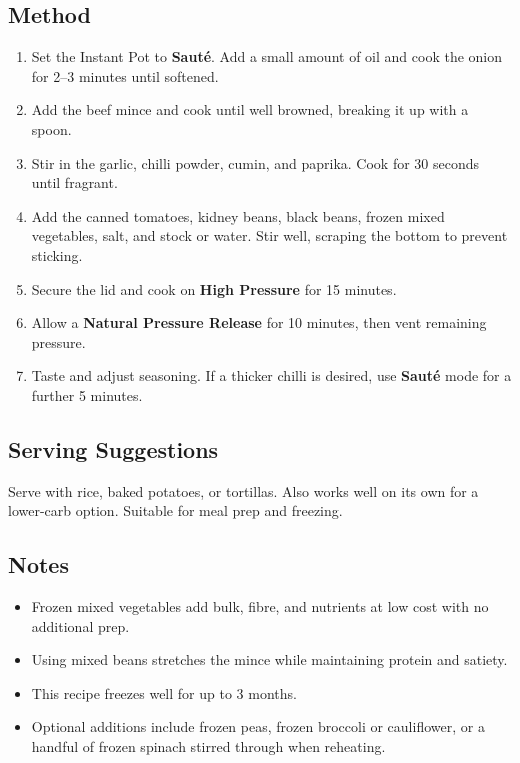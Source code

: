 \documentclass[11pt,a4paper]{article}
\begin{document}
\subsection*{Method}
\begin{enumerate}
    \item Set the Instant Pot to \textbf{Sauté}. Add a small amount of oil and cook the onion for 2--3 minutes until softened.
    \item Add the beef mince and cook until well browned, breaking it up with a spoon.
    \item Stir in the garlic, chilli powder, cumin, and paprika. Cook for 30 seconds until fragrant.
    \item Add the canned tomatoes, kidney beans, black beans, frozen mixed vegetables, salt, and stock or water. Stir well, scraping the bottom to prevent sticking.
    \item Secure the lid and cook on \textbf{High Pressure} for 15 minutes.
    \item Allow a \textbf{Natural Pressure Release} for 10 minutes, then vent remaining pressure.
    \item Taste and adjust seasoning. If a thicker chilli is desired, use \textbf{Sauté} mode for a further 5 minutes.
\end{enumerate}

\vspace{0.5em}

\subsection*{Serving Suggestions}
Serve with rice, baked potatoes, or tortillas. Also works well on its own for a lower-carb option. Suitable for meal prep and freezing.

\vspace{0.5em}

\subsection*{Notes}
\begin{itemize}
    \item Frozen mixed vegetables add bulk, fibre, and nutrients at low cost with no additional prep.
    \item Using mixed beans stretches the mince while maintaining protein and satiety.
    \item This recipe freezes well for up to 3 months.
    \item Optional additions include frozen peas, frozen broccoli or cauliflower, or a handful of frozen spinach stirred through when reheating.
\end{itemize}
\end{document}
